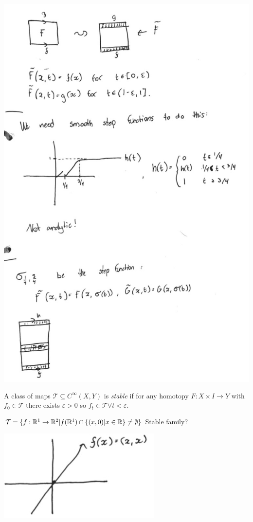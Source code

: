 \begin{center}
    \includegraphics[width=0.40\paperwidth]{difftop/week06/equivrel2}
  \end{center}

\begin{definition}
  A class of maps $\mathcal{T} \subseteq C^{\infty}(X,Y)$ is \emph{stable} if for any homotopy $F: X \times I \to Y$ with $f_0 \in \mathcal{T}$ there exists $\varepsilon >0$ so $f_t \in \mathcal{T} \forall t <\varepsilon$.
\end{definition}
\begin{example}
  $\mathcal{T}=\{f: \mathbb{R}^1 \to \mathbb{R}^2 | f(\mathbb{R}^1) \cap \{(x,0) | x\in \mathbb{R} \} \neq \emptyset \}$ Stable family?
    \begin{center}
      \includegraphics[width=0.30\paperwidth]{difftop/week06/stableEx}
    \end{center}
\end{example}


